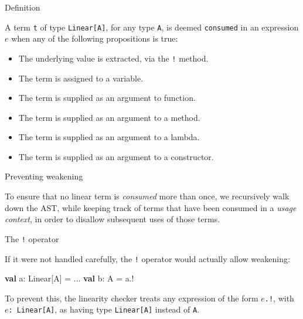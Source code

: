 \documentclass[ignorenonframetext,]{beamer}
\newenvironment{Shaded}{}{}
\newcommand{\KeywordTok}[1]{\textcolor[rgb]{0.00,0.44,0.13}{\textbf{#1}}}
\newcommand{\NormalTok}[1]{#1}
\providecommand{\tightlist}{%
  \setlength{\itemsep}{0pt}\setlength{\parskip}{0pt}}
\begin{document}
\begin{frame}{%
\protect\hypertarget{definition}{%
Definition}}

A term \texttt{t} of type \texttt{Linear[A]}, for any type \texttt{A},
is deemed \texttt{consumed} in an expression \(e\) when any of the
following propositions is true:

\begin{itemize}
\tightlist
\item
  The underlying value is extracted, via the \texttt{!} method.
\item
  The term is assigned to a variable.
\item
  The term is supplied as an argument to function.
\item
  The term is supplied as an argument to a method.
\item
  The term is supplied as an argument to a lambda.
\item
  The term is supplied as an argument to a constructor.
\end{itemize}

\end{frame}

\begin{frame}{%
\protect\hypertarget{preventing-weakening}{%
Preventing weakening}}

To ensure that no linear term is \textit{consumed} more than once, we
recursively walk down the AST, while keeping track of terms that have
been consumed in a \textit{usage context}, in order to disallow
subsequent uses of those terms.

\end{frame}

\begin{frame}[fragile]{%
\protect\hypertarget{the-operator}{%
The \texttt{!} operator}}

If it were not handled carefully, the \texttt{!} operator would actually
allow weakening:

\begin{Shaded}
\begin{Highlighting}[]
\KeywordTok{val}\NormalTok{ a: Linear[A] = ...}
\KeywordTok{val}\NormalTok{ b: A = a.!}
\end{Highlighting}
\end{Shaded}

To prevent this, the linearity checker treats any expression of the form
\texttt{$e$.!}, with \texttt{$e$:\,Linear[A]}, as having type
\texttt{Linear[A]} instead of \texttt{A}.

\end{frame}
\end{document}
